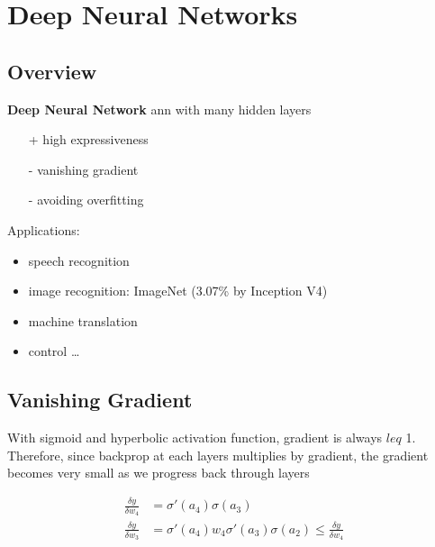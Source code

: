 \documentclass[]{article}
\theoremstyle{definition}
\begin{document}
\section{Deep Neural Networks}
\label{sec:deep_neural_networks}

\subsection{Overview}
\label{sub:deep_neural_network_overview}

\textbf{Deep Neural Network} ann with many hidden layers
\begin{itemize}
    \item[+] high expressiveness
    \item[-] vanishing gradient
    \item[-] avoiding overfitting
\end{itemize}

Applications:
\begin{itemize}
    \item speech recognition
    \item image recognition: ImageNet (3.07\% by Inception V4)
    \item machine translation
    \item control \ldots
\end{itemize}

\subsection{Vanishing Gradient}
\label{sub:vanishing_gradient}

With sigmoid and hyperbolic activation function, gradient is always $leq$ 1. Therefore, since backprop at each layers multiplies by gradient, the gradient becomes very small as we progress back through layers

\begin{align*}
    \frac{\delta y}{\delta w_4} &= \sigma'(a_4) \sigma(a_3) \\
    \frac{\delta y}{\delta w_3} &= \sigma'(a_4) w_4 \sigma'(a_3) \sigma(a_2) \leq \frac{\delta y}{\delta w_4} 
\end{align*}
\end{document}
